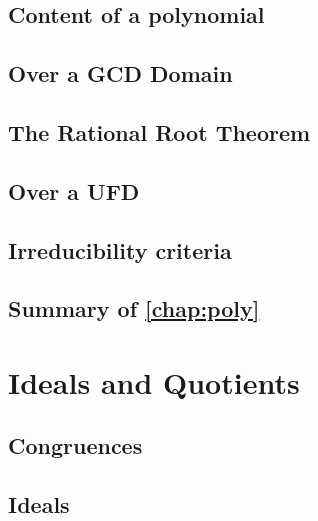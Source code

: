 \documentclass{memoir}
\begin{document}
    \section{Content of a polynomial}
      \label{sec:poly-content}
      
      \newpage

    \section{Over a GCD Domain}
      
      \newpage

    \section{The Rational Root Theorem}
      \label{sec:rat-root-thm}
      
      \newpage

    \section{Over a UFD}
      
      \newpage

    \section{Irreducibility criteria}
      \newpage

    \section*{Summary of \autoref{chap:poly}}
      


  \chapter{Ideals and Quotients}
    \label{chap:quot}
    \newpage

    \section{Congruences}
      \label{sec:congruence}
      
      \newpage

    \section{Ideals}
      \label{sec:ideals}
      
      \newpage
\end{document}
